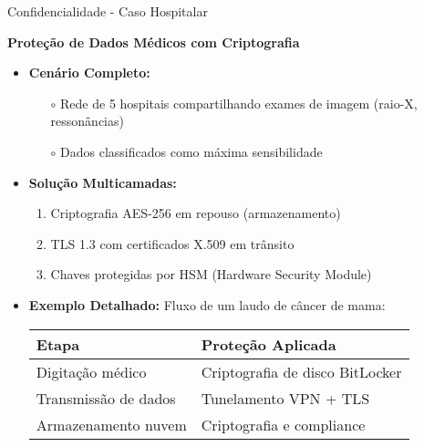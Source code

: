 \begin{frame}{Confidencialidade - Caso Hospitalar}
  \begin{block}{\textbf{Proteção de Dados Médicos com Criptografia}}
    \begin{itemize}
      \item \textbf{Cenário Completo:}
        \begin{itemize}
          \item[$\circ$] Rede de 5 hospitais compartilhando exames de imagem (raio-X, ressonâncias)
          \item[$\circ$] Dados classificados como máxima sensibilidade
        \end{itemize}
      
      \item \textbf{Solução Multicamadas:}
        \begin{enumerate}
          \item Criptografia AES-256 em repouso (armazenamento)
          \item TLS 1.3 com certificados X.509 em trânsito
          \item Chaves protegidas por HSM (Hardware Security Module)
        \end{enumerate}
      
\item \textbf{Exemplo Detalhado:} Fluxo de um laudo de câncer de mama:
            
            \begin{tabular}{|l|l|}
            \hline
            \textbf{Etapa} & \textbf{Proteção Aplicada} \\ \hline
            Digitação médico & Criptografia de disco BitLocker \\ \hline
            Transmissão de dados & Tunelamento VPN + TLS \\ \hline
            Armazenamento nuvem & Criptografia e compliance \\ \hline
            \end{tabular}
        

    \end{itemize}
  \end{block}


\end{frame}
